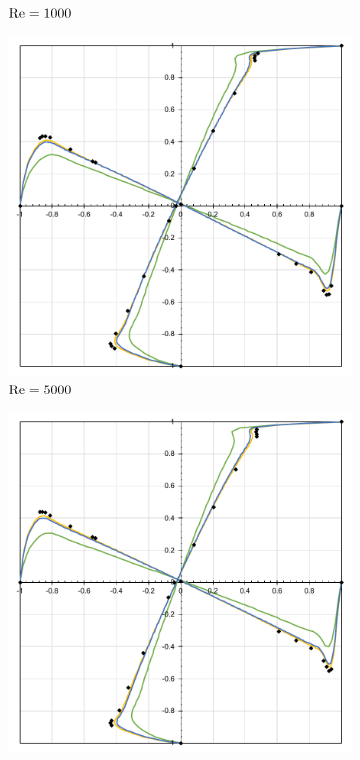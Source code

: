 \begin{figure}[h!]
\begin{subfigure}{0.4\textwidth}
        \caption{$\mathrm{Re}=1000$}
    \end{subfigure}
    \begin{subfigure}{0.4\textwidth}
        \includegraphics[width=\linewidth]{Figuras/Cavity/Re5000.pdf}
        \caption{$\mathrm{Re}=5000$}
    \end{subfigure}
    \begin{subfigure}{0.4\textwidth}
        \includegraphics[width=\linewidth]{Figuras/Cavity/Re7500.pdf}

\end{subfigure}
\end{figure}
